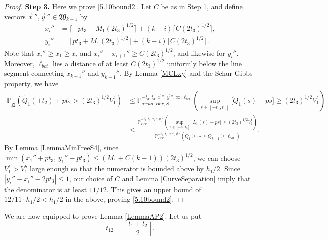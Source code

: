 \begin{proof}
	\noindent\textbf{Step 3.} Here we prove \eqref{5.10bound2}. Let $C$ be as in Step 1, and define vectors $\vec{x}\,'', \vec{y}\,''\in\mathfrak{W}_{k-1}$ by
	\begin{align*}
	x_i'' &= \lceil -pt_3 + M_1(2t_3)^{1/2}\rceil + (k-i)\lceil C(2t_3)^{1/2}\rceil,\\
	y_i'' &= \lceil pt_3 + M_1(2t_3)^{1/2}\rceil + (k-i)\lceil C(2t_3)^{1/2}\rceil.
	\end{align*}
	Note that $x_i'' \geq x_1 \geq x_i$ and $x_i''-x_{i+1}'' \geq C(2t_3)^{1/2}$, and likewise for $y_i''$. Moreover, $\ell_{bot}$ lies a distance of at least $C(2t_3)^{1/2}$ uniformly below the line segment connecting $x_{k-1}''$ and $y_{k-1}''$. By Lemma \ref{MCLxy} and the Schur Gibbs property, we have
	\begin{align*}
	\mathbb{P}_{\tilde{\mathfrak{Q}}}\left(\tilde{Q}_1(\pm t_2) \mp pt_2 > (2t_3)^{1/2}V_1^t\right) &\leq \mathbb{P}^{-t_3,t_3,\vec{x}\,'',\vec{y}\,'',\infty,\ell_{bot}}_{avoid,Ber;S}\left(\sup_{s\in[-t_3,t_3]} \big[\tilde{Q}_1(s)-ps\big] \geq (2t_3)^{1/2}V_1^t\right)\\
	&\leq \frac{\mathbb{P}^{-t_3,t_3,x_1'',y_1''}_{Ber}\left(\sup_{s\in[-t_3,t_3]} \big[\tilde{L}_1(s)-ps\big] \geq (2t_3)^{1/2}V_1^t\right)}{\mathbb{P}^{-t_3,t_3,\vec{x}\,'',\vec{y}\,''}_{Ber}\left(\tilde{Q}_1\geq\cdots\geq\tilde{Q}_{k-1}\geq\ell_{bot}\right)}.
	\end{align*}
	By Lemma \ref{LemmaMinFreeS4}, since $\min(x_1'' + pt_3, \, y_1'' - pt_3) \leq (M_1+C(k-1))(2t_3)^{1/2}$, we can choose $V_1^t > V_1^b$ large enough so that the numerator is bounded above by $h_1/2$. Since $|y_i'' - x_i'' - 2pt_3| \leq 1$, our choice of $C$ and Lemma \ref{CurveSeparation} imply that the denominator is at least $11/12$. This gives an upper bound of $12/11\cdot h_1/2 < h_1/2$ in the above, proving \eqref{5.10bound2}.
	
	
\end{proof}

We are now equipped to prove Lemma \ref{LemmaAP2}. Let us put
\begin{equation}\label{t12}
t_{12} = \left\lfloor \frac{t_1+t_2}{2}\right\rfloor.
\end{equation}

